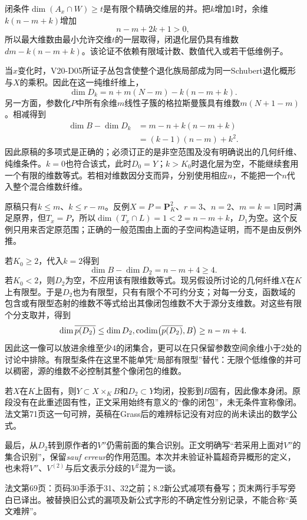 闭条件$\dim(A_x\cap W)\geq t$是有限个精确交维层的并。把$k$增加1时，余维$k(n-m+k)$增加
\[
n-m+2k+1>0,
\]
所以最大维数由最小允许交维$t$的一层取得，闭退化层仍具有维数$dm-k(n-m+k)$。该论证不依赖有限域计数、数值代入或若干低维例子。

当$x$变化时，V20-D05所证子丛包含使整个退化族局部成为同一Schubert退化概形与$X$的乘积。因此在这一纯维纤维上，
\[
\dim D_k=n+m(N-m)-k(n-m+k).
\]
另一方面，参数化$P$中所有余维$m$线性子簇的格拉斯曼簇具有维数$m(N+1-m)$。相减得到
\begin{align*}
\dim B-\dim D_k
&=m-n+k(n-m+k)\\
&=(k-1)(n-m)+k^2.
\end{align*}
因此原稿的多项式是正确的；必须订正的是非空范围及没有明确说出的几何纤维、纯维条件。$k=0$也符合该式，此时$D_0=Y$；$k>K_0$时退化层为空，不能继续套用一个有限的维数等式。若相对维数因分支而异，分别使用相应$n$，不能把一个$n$代入整个混合维数纤维。

原稿只有$k\leq m$、$k\leq r-m$。反例$X=P=\mathbf P^2_K$、$r=3$、$n=2$、$m=k=1$同时满足原界，但$T_x=P$，所以$\dim(T_x\cap L)=1<2=n-m+k$，$D_1$为空。这个反例只用来否定原范围；正确的一般范围由上面的子空间构造证明，而不是由反例外推。

若$K_0\geq2$，代入$k=2$得到
\[
\dim B-\dim D_2=n-m+4\geq4.
\]
若$K_0<2$，则$D_2$为空，不应用该有限维数等式。现另假设所讨论的几何纤维$X$在$K$上有限型。于是$D_2$也为有限型，只有有限个不可约分支；对每一分支，函数域的包含或有限型态射的维数不等式给出其像闭包维数不大于源分支维数。对这些有限个分支取并，得到
\[
\dim\overline{p(D_2)}\leq\dim D_2,
\qquad
\codim\bigl(\overline{p(D_2)},B\bigr)\geq n-m+4.
\]
因此这一像可以放进余维至少4的闭集合，更可以在只保留参数空间余维小于2处的讨论中排除。有限型条件在这里不能单凭“局部有限型”替代：无限个低维像的并可以稠密，源的维数不必控制其整个像闭包的维数。

若$X$在$K$上固有，则$Y\subset X\times_KB$和$D_2\subset Y$均闭，投影到$B$固有，因此像本身闭。原段没有在此重述固有性，正文采用始终有意义的“像的闭包”，未无条件宣称像闭。法文第71页这一句可辨，英稿在Grass后的难辨标记没有对应的尚未读出的数学公式。

最后，从$D_2$转到原作者的$V''$仍需前面的集合识别。正文明确写“若采用上面对$V''$的集合识别”，保留\emph{sauf erreur}的作用范围。本次并未验证补篇超奇异概形的定义，也未将$V''$、$V^{(2)}$与后文表示分歧的$V^2$混为一谈。

法文第69页：页码30手添于31、32之前；8.2新公式减项有叠写；页末两行手写旁白已译出。被替换旧公式的漏项及新公式字形的不确定性分别记录，不能合称“英文难辨”。

